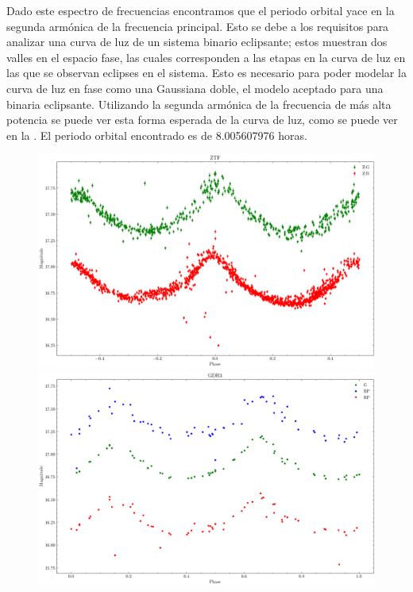 Dado este espectro de frecuencias encontramos que el periodo orbital yace en la
segunda armónica de la frecuencia principal. Esto se debe a los requisitos para
analizar una curva de luz de un sistema binario eclipsante; estos muestran dos
valles en el espacio fase, las cuales corresponden a las etapas en la curva de
luz en las que se observan eclipses en el sistema. Esto es necesario para poder
modelar la curva de luz en fase como una Gaussiana doble, el modelo aceptado
para una binaria eclipsante. %
Utilizando la segunda armónica de la frecuencia de más alta potencia se puede
ver esta forma esperada de la curva de luz, como se puede ver en la
. El periodo orbital encontrado es de
8.005607976 horas.

\begin{figure}[!h]
	\centering
	\includegraphics[scale=0.3]{Metodologia/Secciones/AnalisisPeriodo/Figures/ZTF Phase-Folded.png}
	\includegraphics[scale=0.3]{Metodologia/Secciones/AnalisisPeriodo/Figures/Gaia Phase-Folded.png}

\end{figure}

